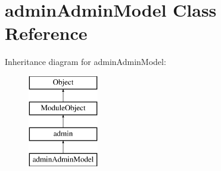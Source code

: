 \hypertarget{classadminAdminModel}{}\section{admin\+Admin\+Model Class Reference}
\label{classadminAdminModel}
Inheritance diagram for admin\+Admin\+Model\+:\begin{figure}[H]
\begin{center}
\leavevmode
\includegraphics[height=4.000000cm]{classadminAdminModel}
\end{center}
\end{figure}
